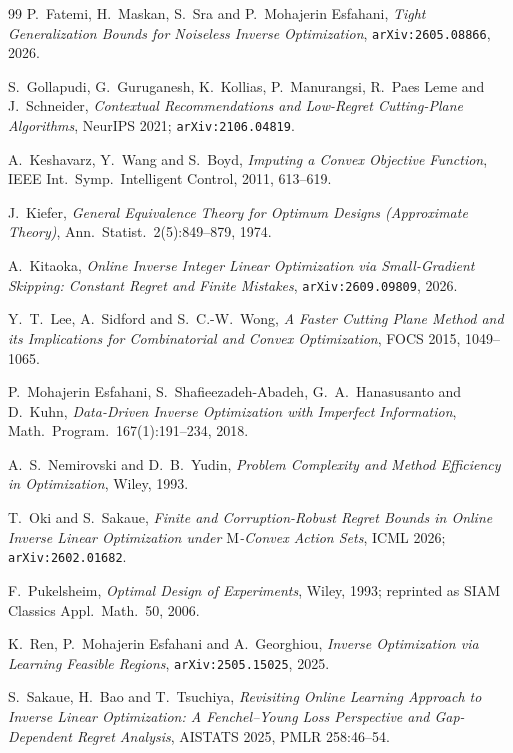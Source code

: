 \documentclass[11pt]{article}
\theoremstyle{plain}
\theoremstyle{definition}
\theoremstyle{remark}
\begin{document}
\begin{thebibliography}{99}
P.~Fatemi, H.~Maskan, S.~Sra and P.~Mohajerin Esfahani,
\emph{Tight Generalization Bounds for Noiseless Inverse Optimization},
\texttt{arXiv:2605.08866}, 2026.

S.~Gollapudi, G.~Guruganesh, K.~Kollias, P.~Manurangsi, R.~Paes Leme and J.~Schneider,
\emph{Contextual Recommendations and Low-Regret Cutting-Plane Algorithms},
NeurIPS 2021; \texttt{arXiv:2106.04819}.

A.~Keshavarz, Y.~Wang and S.~Boyd,
\emph{Imputing a Convex Objective Function},
IEEE Int.\ Symp.\ Intelligent Control, 2011, 613--619.

J.~Kiefer,
\emph{General Equivalence Theory for Optimum Designs (Approximate Theory)},
Ann.\ Statist.\ 2(5):849--879, 1974.

A.~Kitaoka,
\emph{Online Inverse Integer Linear Optimization via Small-Gradient Skipping: Constant Regret and
Finite Mistakes},
\texttt{arXiv:2609.09809}, 2026.

Y.~T.~Lee, A.~Sidford and S.~C.-W.~Wong,
\emph{A Faster Cutting Plane Method and its Implications for Combinatorial and Convex Optimization},
FOCS 2015, 1049--1065.

P.~Mohajerin Esfahani, S.~Shafieezadeh-Abadeh, G.~A.~Hanasusanto and D.~Kuhn,
\emph{Data-Driven Inverse Optimization with Imperfect Information},
Math.\ Program.\ 167(1):191--234, 2018.

A.~S.~Nemirovski and D.~B.~Yudin,
\emph{Problem Complexity and Method Efficiency in Optimization},
Wiley, 1993.

T.~Oki and S.~Sakaue,
\emph{Finite and Corruption-Robust Regret Bounds in Online Inverse Linear Optimization under
$\mathrm{M}$-Convex Action Sets},
ICML 2026; \texttt{arXiv:2602.01682}.

F.~Pukelsheim,
\emph{Optimal Design of Experiments},
Wiley, 1993; reprinted as SIAM Classics Appl.\ Math.\ 50, 2006.

K.~Ren, P.~Mohajerin Esfahani and A.~Georghiou,
\emph{Inverse Optimization via Learning Feasible Regions},
\texttt{arXiv:2505.15025}, 2025.

S.~Sakaue, H.~Bao and T.~Tsuchiya,
\emph{Revisiting Online Learning Approach to Inverse Linear Optimization: A Fenchel--Young Loss
Perspective and Gap-Dependent Regret Analysis},
AISTATS 2025, PMLR 258:46--54.


\end{thebibliography}
\end{document}

